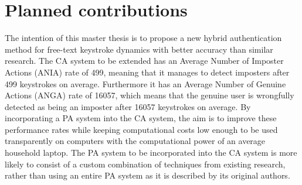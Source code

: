 \documentclass[informationsecurity]{gucmasterproject}
\begin{document}
\section{Planned contributions}
The intention of this master thesis is to propose a new hybrid authentication method for free-text keystroke dynamics with better accuracy than similar research.
The CA system to be extended \cite{mondal} has an Average Number of Imposter Actions (ANIA) rate of 499, meaning that it manages to detect imposters after 499 keystrokes on average. 
Furthermore it has an Average Number of Genuine Actions (ANGA) rate of 16057, which means that the genuine user is wrongfully detected as being an imposter after 16057 keystrokes on average.
By incorporating a PA system into the CA system, the aim is to improve these performance rates while keeping computational costs low enough to be used transparently on computers with the computational power of an average household laptop.
The PA system to be incorporated into the CA system is more likely to consist of a custom combination of techniques from existing research, rather than using an entire PA system as it is described by its original authors.
%
\end{document}
